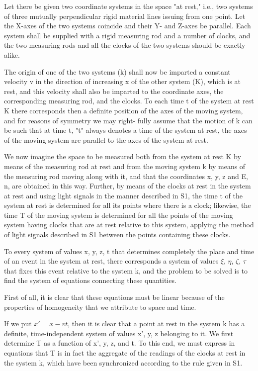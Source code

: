 ﻿\documentclass{article} %
\begin{document}
Let there be given two coordinate systems in the space "at rest," i.e., two systems of three mutually perpendicular rigid material lines issuing from one point. 
Let the X-axes of the two systems coincide and their Y- and Z-axes be parallel. 
Each system shall be supplied with a rigid measuring rod and a number of clocks, and the two measuring rods and all the clocks of the two systems should be exactly alike. 

The origin of one of the two systems (k) shall now be imparted a constant velocity v in the direction of increasing x of the other system (K), which is at rest, and this velocity shall also be imparted to the coordinate axes, the corresponding measuring rod, and the clocks. 
To each time t of the system at rest K there corresponds then a definite position of the axes of the moving system, and for reasons of symmetry we may right- fully assume that the motion of k can be such that at time t, "t" always denotes a time of the system at rest, the axes of the moving system are parallel to the axes of the system at rest. 

We now imagine the space to be measured both from the system at rest K by means of the measuring rod at rest and from the moving system k by means of the measuring rod moving along with it, and that the coordinates x, y, z and E, n, are obtained in this way. 
Further, by means of the clocks at rest in the system at rest and using light signals in the manner described in S1, the time t of the system at rest is determined for all its points where there is a clock; likewise, the time T of the moving system is determined for all the points of the moving system having clocks that are at rest relative to this system, applying the method of light signals described in S1 between the points containing these clocks. 

To every system of values x, y, z, t that determines completely the place and time of an event in the system at rest, there corresponds a system of values $\xi$, $\eta$, $\zeta$, $\tau$ that fixes this event relative to the system k, and the problem to be solved is to find the system of equations connecting these quantities. 

First of all, it is clear that these equations must be linear because of the properties of homogeneity that we attribute to space and time. 

If we put $x'=x-vt$, then it is clear that a point at rest in the system k has a definite, time-independent system of values x', y, z belonging to it. 
We first determine T as a function of x', y, z, and t. 
To this end, we must express in equations that T is in fact the aggregate of the readings of the clocks at rest in the system k, which have been synchronized according to the rule given in S1. 
\end{document}
